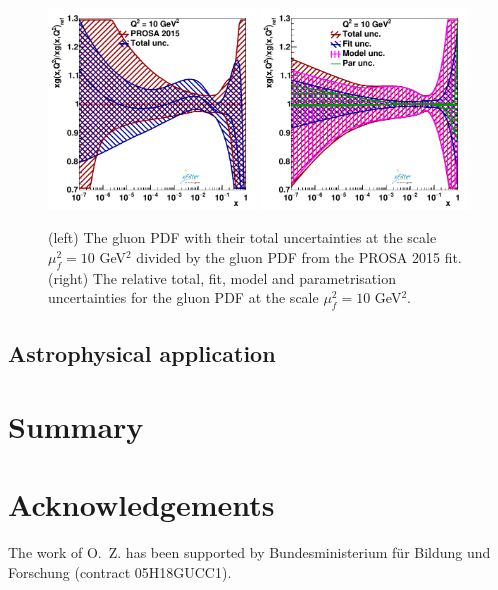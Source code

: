 \documentclass[12pt]{article}
\begin{document}
\begin{figure}
    \centering
    \includegraphics[width=0.49\textwidth]{figs/q2_10_pdf_g_ratio.pdf}
    \includegraphics[width=0.49\textwidth]{figs/gluonunc.pdf}
    \caption{(left) The gluon PDF with their total uncertainties at the scale $\mu^2_f=10$ GeV$^2$ divided by the gluon PDF from the PROSA 2015 fit. (right) The relative total, fit, model and parametrisation uncertainties for the gluon PDF at the scale $\mu^2_f=10$ GeV$^2$.}
    \label{fig:pdfratios}
\end{figure}

\subsection{Astrophysical application}
\label{sec:astro}

\section{Summary}
\label{sec:summary}

\section*{Acknowledgements}

The work of O.~Z. has been supported by Bundesministerium f\"ur Bildung und Forschung (contract 05H18GUCC1).
\end{document}
